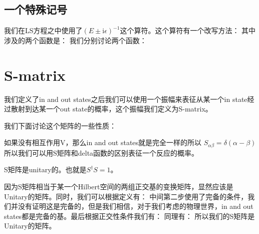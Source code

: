 \subsection{一个特殊记号}

我们在LS方程之中使用了$ (E \pm \mathrm{i} \epsilon)^{-1} $这个算符。这个算符有一个改写方法：
其中涉及的两个函数是：
我们分别讨论两个函数：

\section{S-matrix}
我们定义了in and out states之后我们可以使用一个振幅来表征从某一个in state经过散射到达某一个out state的概率，这个振幅我们定义为S-matrix。

我们下面讨论这个矩阵的一些性质：
\bigskip

如果没有相互作用V，那么in and out states就是完全一样的所以 $ S_{\alpha\beta} = \delta(\alpha-\beta) $ 所以我们可以用S矩阵和delta函数的区别表征一个反应的概率。

\bigskip

 S矩阵是unitary的。也就是$ S^\dagger S = 1 $。

因为S矩阵相当于某一个Hilbert空间的两组正交基的变换矩阵，显然应该是Unitary的矩阵。同时，我们可以根据定义有：
中间第二步使用了完备的条件，我们并没有证明这是完备的，但是我们相信，对于我们考虑的物理世界，in and out states都是完备的基。最后根据正交性条件我们有：
同理有：
所以我们的S矩阵是Unitary的矩阵。
\bigskip


